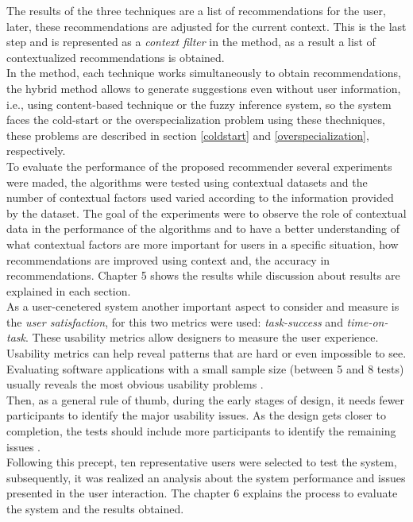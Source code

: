 The results of the three techniques are a list of recommendations for
the user, later, these recommendations are adjusted for the current context.
This is the last step and is represented as a \textit{context filter} in the
method, as a result a list of contextualized
recommendations is obtained. \\
In the method, each technique works simultaneously to obtain
recommendations, the hybrid method allows to generate suggestions even
without user information, i.e., using content-based technique or the
fuzzy inference system, so the system faces the cold-start or the
overspecialization problem using these thechniques, these problems are
described in section \ref{coldstart} and 
 \ref{overspecialization}, respectively.\\
To evaluate the performance of the proposed recommender several experiments
were maded, the algorithms were tested using contextual datasets and
the number of contextual factors used varied according to the information
provided by the dataset. The goal of the experiments were to observe
the role of contextual data  in the performance of the algorithms and to 
have a better understanding of what contextual
factors are more important for users in a specific situation, how recommendations
are improved using context and, the accuracy in recommendations.
Chapter 5 shows the results while discussion about results are
explained in each section.\\
As a user-cenetered system another important aspect 
to consider and measure is the \textit{user satisfaction}, for this two
metrics were used: \textit{task-success} and \textit
{time-on-task}. These usability metrics allow designers to measure 
the user experience.
\\ Usability
metrics can help reveal patterns that are hard or even impossible to
see. Evaluating software applications with a small sample size 
(between 5 and 8 tests) usually reveals the most obvious 
usability problems \cite{albert2013measuring}.\\ 
Then, as
a general rule of thumb, during the early stages of design, it needs
fewer participants to identify the major usability issues. As the
design gets closer to completion, the tests should include more
participants to identify the remaining
issues \cite{albert2013measuring}.\\ 
Following this precept, ten representative users were selected to test
the system, subsequently, it was realized an analysis about the system
performance and issues presented in the user interaction. The chapter
6 explains the process to evaluate the system and the
results obtained.
